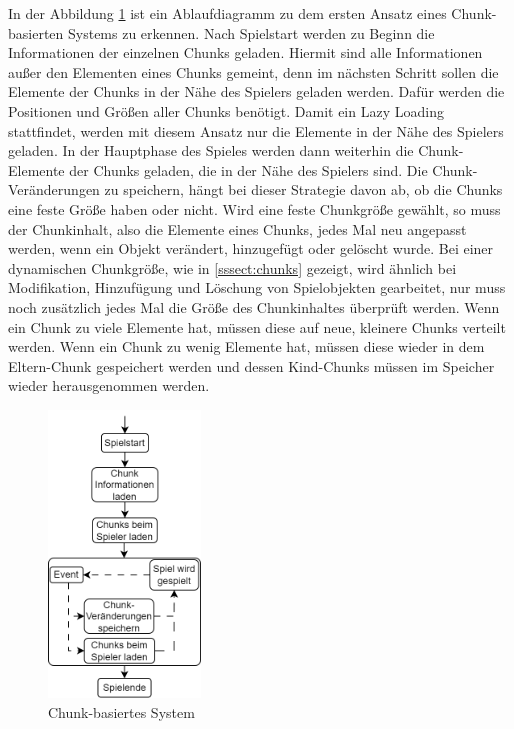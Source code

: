 In der Abbildung \ref{fig:chunkBasedSystem} ist ein Ablaufdiagramm zu dem ersten Ansatz eines Chunk-basierten Systems zu erkennen. Nach Spielstart werden zu Beginn die Informationen der einzelnen Chunks geladen. Hiermit sind alle Informationen außer den Elementen eines Chunks gemeint, denn im nächsten Schritt sollen die Elemente der Chunks in der Nähe des Spielers geladen werden. Dafür werden die Positionen und Größen aller Chunks benötigt. Damit ein Lazy Loading stattfindet, werden mit diesem Ansatz nur die Elemente in der Nähe des Spielers geladen. In der Hauptphase des Spieles werden dann weiterhin die Chunk-Elemente der Chunks geladen, die in der Nähe des Spielers sind. Die Chunk-Veränderungen zu speichern, hängt bei dieser Strategie davon ab, ob die Chunks eine feste Größe haben oder nicht. Wird eine feste Chunkgröße gewählt, so muss der Chunkinhalt, also die Elemente eines Chunks, jedes Mal neu angepasst werden, wenn ein Objekt verändert, hinzugefügt oder gelöscht wurde.  Bei einer dynamischen Chunkgröße, wie in \ref{sssect:chunks} gezeigt, wird ähnlich bei Modifikation, Hinzufügung und Löschung von Spielobjekten gearbeitet, nur muss noch zusätzlich jedes Mal die Größe des Chunkinhaltes überprüft werden. Wenn ein Chunk zu viele Elemente hat, müssen diese auf neue, kleinere Chunks verteilt werden. Wenn ein Chunk zu wenig Elemente hat, müssen diese wieder in dem Eltern-Chunk gespeichert werden und dessen Kind-Chunks müssen im Speicher wieder herausgenommen werden.

\begin{figure}[htp]
    \centering
    \includegraphics[width=0.36\textwidth]{images/Chunkbasiert.png}
    \caption{Chunk-basiertes System}
    \label{fig:chunkBasedSystem}
\end{figure}

